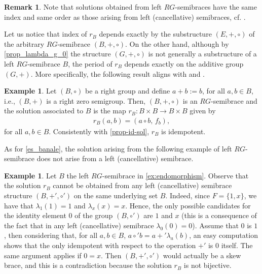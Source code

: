 \documentclass[11pt]{amsart}
\newtheorem{corollary}[theorem]{Corollary}
\theoremstyle{definition}
\newtheorem{remark}[theorem]{Remark}
\newtheorem{Ex}[theorem]{Example}
\begin{document}
\begin{remark}
Note that solutions obtained from left $RG$-semibraces 
have the same index and same order as those arising from left (cancellative) semibraces, cf. \cite[Corollary 13]{CCSt20-2}.
\end{remark}

\smallskip
Let us notice that index of $r_B$ depends exactly by the substructure $(E,+,\circ)$ of the arbitrary $RG$-semibrace $(B,+,\circ)$. On the other hand, although by \cref{prop_lambda_g_0} the structure $(G,+,\circ)$ is not generally a substructure of a left $RG$-semibrace $B$, the period of $r_B$ depends exactly on the additive group $(G,+)$. 
More specifically, the following result aligns with \cite[Corollary 13]{CCSt20-2} and \cite[Theorem 5.1]{JeAr19}.


\smallskip

\begin{Ex}
    Let $(B,\circ)$ be a right group and define $a+b:= b$, for all $a,b\in B$, i.e., $(B,+)$ is a right zero semigroup. Then, $(B,+,\circ)$ is an $RG$-semibrace and the solution associated to $B$ is the map $r_B:B\times B\to B\times B$ given by
    \begin{align*}
        r_B(a,b) = (a\circ b,\, f_b),
    \end{align*}
    for all $a,b\in B$. Consistently with \cref{prop-id-sol}, $r_B$ is idempotent.
\end{Ex}

\smallskip



As for \cref{es_banale}, the solution arising from the following example of left $RG$-semibrace does not arise from a left (cancellative) semibrace.
\begin{Ex}
Let $B$ the left $RG$-semibrace in \cref{ex:endomorphism}. Observe that the solution $r_B$ cannot be obtained from any left (cancellative) semibrace structure $\left(B, +', \circ'\right)$ on the same underlying set $B$. Indeed, since $F=\{1,x\}$, we have that $\lambda_1(1)=1$ and $\lambda_x(x)=x$. Hence, the only possible candidates for the identity element $0$ of the group $\left(B, \circ'\right)$ are $1$ and $x$ (this is a consequence of the fact that in any left (cancellative) semibrace $\lambda_0(0)=0$). Assume that $0$ is $1$, then considering that, for all $a, b \in B$, $a \circ' b=a +' \lambda_a(b)$, an easy computation shows that the only idempotent with respect to the operation $+'$ is $0$ itself.
  The same argument applies if $0=x$. Then  $\left(B, +', \circ'\right)$ would actually be a skew brace, and this is a contradiction because the solution $r_B$ is not bijective.
\end{Ex}
\end{document}
